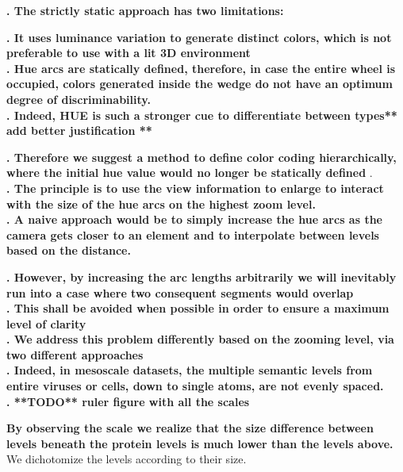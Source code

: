 \documentclass[review,journal]{vgtc}         %
\begin{document}
\textbf{. The strictly static approach has two limitations:}

\textbf{. It uses luminance variation to generate distinct colors, which is not preferable to use with a lit 3D environment} \\

\textbf{. Hue arcs are statically defined, therefore, in case the entire wheel is occupied, colors generated inside the wedge do not have an optimum degree of discriminability.  } \\

\textbf{. Indeed, HUE is such a stronger cue to differentiate between types** add better justification **}

\textbf{. Therefore we suggest a method to define color coding hierarchically, where the initial hue value would no longer be statically defined }. \\

\textbf{. The principle is to use the view information to enlarge to interact with the size of the hue arcs on the highest zoom level.} \\

\textbf{. A naive approach would be to simply increase the hue arcs as the camera gets closer to an element and to interpolate between levels based on the distance. }

\textbf{. However, by increasing the arc lengths arbitrarily we will inevitably run into a case where two consequent segments would overlap } \\

\textbf{. This shall be avoided when possible in order to ensure a maximum level of clarity } \\


\textbf{. We address this problem differently based on the zooming level, via two different approaches} \\

\textbf{. Indeed, in mesoscale datasets, the multiple semantic levels from entire viruses or cells, down to single atoms, are not evenly spaced.} \\

\textbf{ . **TODO** ruler figure with all the scales}


\textbf{By observing the scale we realize that the size difference between levels beneath the protein levels is much lower than the levels above.} \\

We dichotomize the levels according to their size.
\end{document}

